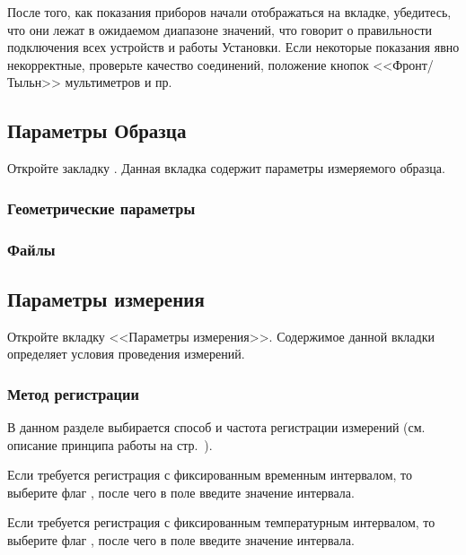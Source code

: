 \documentclass[12pt, a4paper, twocolumn]{report}
\begin{document}
После того, как показания приборов начали отображаться на вкладке, убедитесь, что они лежат в ожидаемом диапазоне значений, что говорит о правильности подключения всех устройств и работы Установки. Если некоторые показания явно некорректные, проверьте качество соединений, положение кнопок <<Фронт/Тыльн>> мультиметров и пр.

\subsection{Параметры Образца}

Откройте закладку . Данная вкладка содержит параметры измеряемого образца.

\subsubsection{Геометрические параметры}
\label{sec_geom_params}



\subsubsection{Файлы}



\subsection{Параметры измерения}

Откройте вкладку <<Параметры измерения>>. Содержимое данной вкладки определяет условия проведения измерений.

\subsubsection{Метод регистрации}
\label{sec_reg_method}

В данном разделе выбирается способ и частота регистрации измерений (см. описание принципа работы на стр.~\pageref{sec_registration_types}).

Если требуется регистрация с фиксированным временным интервалом, то выберите флаг , после чего в поле  введите значение интервала.

Если требуется регистрация с фиксированным температурным интервалом, то выберите флаг , после чего в поле  введите значение интервала.
\end{document}
